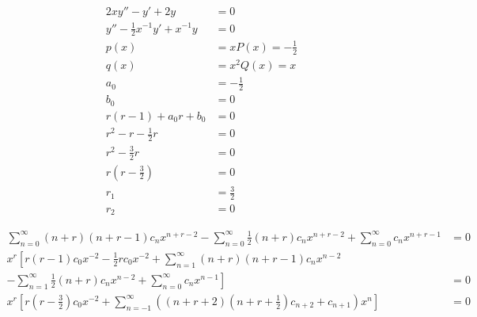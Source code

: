 \documentclass{article}
\begin{document}
\begin{align*}
  2 x y'' - y' + 2 y                     & = 0                     \\
  y'' - \frac{1}{2} x^{-1} y' + x^{-1} y & = 0                     \\
  p(x)                                   & = x P(x) = -\frac{1}{2} \\
  q(x)                                   & = x^2 Q(x) = x          \\
  a_0                                    & = -\frac{1}{2}          \\
  b_0                                    & = 0                     \\
  r (r - 1) + a_0 r + b_0                & = 0                     \\
  r^2 - r - \frac{1}{2} r                & = 0                     \\
  r^2 - \frac{3}{2} r                    & = 0                     \\
  r \left( r - \frac{3}{2} \right)       & = 0                     \\
  r_1                                    & = \frac{3}{2}           \\
  r_2                                    & = 0
\end{align*}

\begin{align*}
  \sum_{n = 0}^\infty (n + r) (n + r - 1) c_n x^{n + r - 2} - \sum_{n = 0}^\infty \frac{1}{2} (n + r) c_n x^{n + r - 2} + \sum_{n = 0}^\infty c_n x^{n + r - 1}                 & = 0 \\
  x^r \left[ r (r - 1) c_0 x^{-2} - \frac{1}{2} r c_0 x^{-2} + \sum_{n = 1}^\infty (n + r) (n + r - 1) c_n x^{n - 2} \right. \qquad                                             &     \\
  \left. - \sum_{n = 1}^\infty \frac{1}{2} (n + r) c_n x^{n - 2} + \sum_{n = 0}^\infty c_n x^{n - 1} \right]                                                                    & = 0 \\
  x^r \left[ r \left( r - \frac{3}{2} \right) c_0 x^{-2} + \sum_{n = -1}^\infty \left( (n + r + 2) \left( n + r + \frac{1}{2} \right) c_{n + 2} + c_{n + 1} \right) x^n \right] & = 0
\end{align*}
\end{document}
